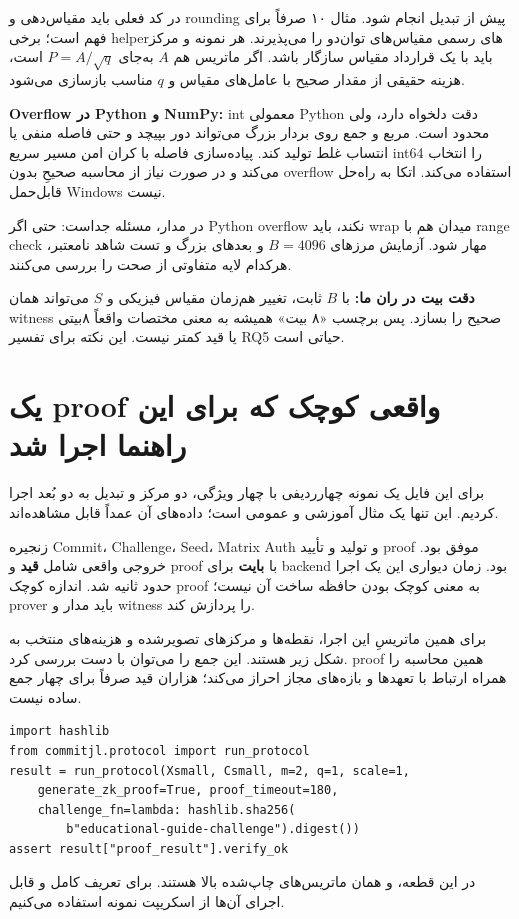 \documentclass[11pt,a4paper]{article}
\newcommand{\lesson}[1]{\clearpage\section{#1}}
\newcommand{\codefile}[1]{\begin{latin}\end{latin}}
\begin{document}
در کد فعلی باید مقیاس‌دهی و rounding پیش از تبدیل انجام شود. مثال ۱۰ صرفاً برای فهم است؛ برخی helperهای رسمی مقیاس‌های توان‌دو را می‌پذیرند. هر نمونه و مرکز باید با یک قرارداد مقیاس سازگار باشد. اگر ماتریس هم \(A\) به‌جای \(P=A/\sqrt q\) است، هزینه حقیقی از مقدار صحیح با عامل‌های مقیاس و \(q\) مناسب بازسازی می‌شود.

\textbf{Overflow در Python و NumPy:} int معمولی Python دقت دلخواه دارد، ولی  محدود است. مربع و جمع روی بردار بزرگ می‌تواند دور بپیچد و حتی فاصله منفی یا انتساب غلط تولید کند. پیاده‌سازی فاصله با کران امن مسیر سریع int64 را انتخاب می‌کند و در صورت نیاز از محاسبه صحیحِ بدون overflow استفاده می‌کند. اتکا به  راه‌حل قابل‌حمل Windows نیست.

در مدار، مسئله جداست: حتی اگر Python overflow نکند، باید wrap میدان هم با range check مهار شود. آزمایش مرزهای \(B=4096\) و بعدهای بزرگ و تست شاهد نامعتبر، هرکدام لایه متفاوتی از صحت را بررسی می‌کنند.

\textbf{دقت بیت در ران ما:} با \(B\) ثابت، تغییر هم‌زمان مقیاس فیزیکی و \(S\) می‌تواند همان witness صحیح را بسازد. پس برچسب «۸ بیت» همیشه به معنی مختصات واقعاً ۸بیتی یا قید کمتر نیست. این نکته برای تفسیر RQ5 حیاتی است.

\lesson{یک proof واقعی کوچک که برای این راهنما اجرا شد}
برای این فایل یک نمونه چهارردیفی با چهار ویژگی، دو مرکز و تبدیل به دو بُعد اجرا کردیم. این تنها یک مثال آموزشی و عمومی است؛ داده‌های آن عمداً قابل مشاهده‌اند.
\codefile{proof_output.txt}
زنجیره Commit، Challenge، Seed، Matrix Auth و تولید و تأیید proof موفق بود. خروجی واقعی شامل \textbf{\lr{\ProofConstraints} قید} و proof با \textbf{\lr{\ProofBytes} بایت} برای backend  بود. زمان دیواری این یک اجرا حدود \lr{\ProofWall} ثانیه شد. اندازه کوچک proof به معنی کوچک بودن حافظه ساخت آن نیست؛ prover باید مدار و witness را پردازش کند.

برای همین ماتریسِ این اجرا، نقطه‌ها و مرکزهای تصویرشده و هزینه‌های منتخب به شکل زیر هستند. این جمع را می‌توان با دست بررسی کرد. proof همین محاسبه را همراه ارتباط با تعهدها و بازه‌های مجاز احراز می‌کند؛ هزاران قید صرفاً برای چهار جمع ساده نیست.


\begin{latin}\begin{lstlisting}
import hashlib
from commitjl.protocol import run_protocol
result = run_protocol(Xsmall, Csmall, m=2, q=1, scale=1,
    generate_zk_proof=True, proof_timeout=180,
    challenge_fn=lambda: hashlib.sha256(
        b"educational-guide-challenge").digest())
assert result["proof_result"].verify_ok
\end{lstlisting}\end{latin}
در این قطعه،  و  همان ماتریس‌های چاپ‌شده بالا هستند. برای تعریف کامل و قابل اجرای آن‌ها از اسکریپت نمونه استفاده می‌کنیم.
\end{document}
